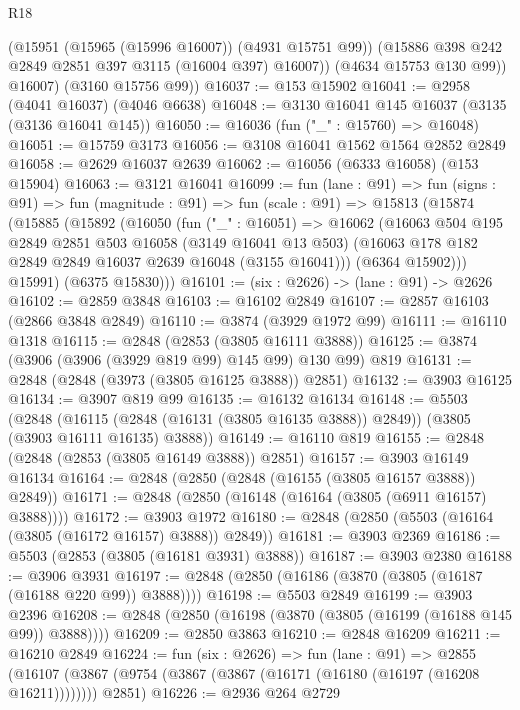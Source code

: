 \begin{lexlean}{R18}
\begin{coremodule}
            (@15951 (@15965 (@15996 @16007)) (@4931 @15751 @99))
            (@15886 @398 @242 @2849 @2851 @397 @3115 (@16004 @397) @16007))
          (@4634 @15753 @130 @99))
        @16007)
      (@3160 @15756 @99))
@16037 := @153 @15902
@16041 := @2958 (@4041 @16037) (@4046 @6638)
@16048 := @3130 @16041 @145 @16037 (@3135 (@3136 @16041 @145))
@16050 := @16036 (fun ("_" : @15760) => @16048)
@16051 := @15759 @3173
@16056 := @3108 @16041 @1562 @1564 @2852 @2849
@16058 := @2629 @16037 @2639
@16062 := @16056 (@6333 @16058) (@153 @15904)
@16063 := @3121 @16041
@16099 := fun (lane : @91) =>
  fun (signs : @91) =>
  fun (magnitude : @91) =>
  fun (scale : @91) =>
  @15813
    (@15874
      (@15885
        (@15892
          (@16050
            (fun ("_" : @16051) =>
            @16062
              (@16063
                @504
                @195
                @2849
                @2851
                @503
                @16058
                (@3149 @16041 @13 @503)
                (@16063 @178 @182 @2849 @2849 @16037 @2639 @16048 (@3155 @16041)))
              (@6364 @15902)))
          @15991)
        (@6375 @15830)))
@16101 := (six : @2626) -> (lane : @91) -> @2626
@16102 := @2859 @3848
@16103 := @16102 @2849
@16107 := @2857 @16103 (@2866 @3848 @2849)
@16110 := @3874 (@3929 @1972 @99)
@16111 := @16110 @1318
@16115 := @2848 (@2853 (@3805 @16111 @3888))
@16125 := @3874 (@3906 (@3906 (@3929 @819 @99) @145 @99) @130 @99) @819
@16131 := @2848 (@2848 (@3973 (@3805 @16125 @3888)) @2851)
@16132 := @3903 @16125
@16134 := @3907 @819 @99
@16135 := @16132 @16134
@16148 := @5503
    (@2848 (@16115 (@2848 (@16131 (@3805 @16135 @3888)) @2849)) (@3805 (@3903 @16111 @16135) @3888))
@16149 := @16110 @819
@16155 := @2848 (@2848 (@2853 (@3805 @16149 @3888)) @2851)
@16157 := @3903 @16149 @16134
@16164 := @2848 (@2850 (@2848 (@16155 (@3805 @16157 @3888)) @2849))
@16171 := @2848 (@2850 (@16148 (@16164 (@3805 (@6911 @16157) @3888))))
@16172 := @3903 @1972
@16180 := @2848 (@2850 (@5503 (@16164 (@3805 (@16172 @16157) @3888)) @2849))
@16181 := @3903 @2369
@16186 := @5503 (@2853 (@3805 (@16181 @3931) @3888))
@16187 := @3903 @2380
@16188 := @3906 @3931
@16197 := @2848 (@2850 (@16186 (@3870 (@3805 (@16187 (@16188 @220 @99)) @3888))))
@16198 := @5503 @2849
@16199 := @3903 @2396
@16208 := @2848 (@2850 (@16198 (@3870 (@3805 (@16199 (@16188 @145 @99)) @3888))))
@16209 := @2850 @3863
@16210 := @2848 @16209
@16211 := @16210 @2849
@16224 := fun (six : @2626) =>
  fun (lane : @91) =>
  @2855 (@16107 (@3867 (@9754 (@3867 (@3867 (@16171 (@16180 (@16197 (@16208 @16211)))))))) @2851)
@16226 := @2936 @264 @2729

\end{coremodule}
\end{lexlean}
